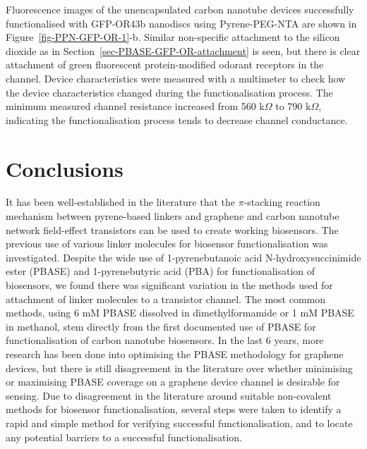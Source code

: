 \documentclass[
  a4paper,
]{scrbook}
\begin{document}
Fluorescence images of the unencapsulated carbon nanotube devices
successfully functionalised with GFP-OR43b nanodiscs using
Pyrene-PEG-NTA are shown in Figure~\ref{fig-PPN-GFP-OR-1}-b. Similar
non-specific attachment to the silicon dioxide as in
Section~\ref{sec-PBASE-GFP-OR-attachment} is seen, but there is clear
attachment of green fluorescent protein-modified odorant receptors in
the channel. Device characteristics were measured with a multimeter to
check how the device characteristics changed during the
functionalisation process. The minimum measured channel resistance
increased from 560 k\(\Omega\) to 790 k\(\Omega\), indicating the
functionalisation process tends to decrease channel conductance.

\hypertarget{sec-conclusions}{%
\section{Conclusions}\label{sec-conclusions}}

It has been well-established in the literature that the \(\pi\)-stacking
reaction mechanism between pyrene-based linkers and graphene and carbon
nanotube network field-effect transistors can be used to create working
biosensors. The previous use of various linker molecules for biosensor
functionalisation was investigated. Despite the wide use of
1-pyrenebutanoic acid N-hydroxysuccinimide ester (PBASE) and
1-pyrenebutyric acid (PBA) for functionalisation of biosensors, we found
there was significant variation in the methods used for attachment of
linker molecules to a transistor channel. The most common methods, using
6 mM PBASE dissolved in dimethylformamide or 1 mM PBASE in methanol,
stem directly from the first documented use of PBASE for
functionalisation of carbon nanotube biosensors. In the last 6 years,
more research has been done into optimising the PBASE methodology for
graphene devices, but there is still disagreement in the literature over
whether minimising or maximising PBASE coverage on a graphene device
channel is desirable for sensing. Due to disagreement in the literature
around suitable non-covalent methods for biosensor functionalisation,
several steps were taken to identify a rapid and simple method for
verifying successful functionalisation, and to locate any potential
barriers to a successful functionalisation.
\end{document}

